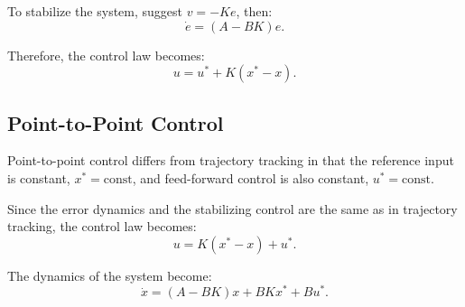 To stabilize the system, suggest \(v = -Ke\), then:
\[\dot{e} = (A - BK)e.\]

Therefore, the control law becomes:
\[u = u^* + K(x^* - x).\]

\subsection{Point-to-Point Control}

Point-to-point control differs from trajectory tracking in that the reference input is constant, \(x^* = \text{const}\), and feed-forward control is also constant, \(u^* = \text{const}\).

Since the error dynamics and the stabilizing control are the same as in trajectory tracking, the control law becomes:
\[u = K(x^* - x) + u^*.\]

The dynamics of the system become:
\[\dot{x} = (A - BK)x + BKx^* + Bu^*.\]